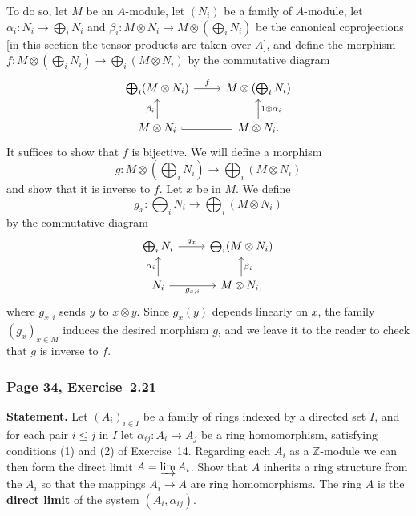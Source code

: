 \documentclass[12pt,letterpaper]{article}%
\begin{document}
To do so, let $M$ be an $A$-module, let $(N_i)$ be a family of $A$-module, let $\alpha_i:N_i\to\bigoplus_iN_i$ and $\beta_i:M\otimes N_i\to M\otimes(\bigoplus_iN_i)$ be the canonical coprojections [in this section the tensor products are taken over $A$], and define the morphism $f:M\otimes(\bigoplus_iN_i)\to\bigoplus_i(M\otimes N_i)$ by the commutative diagram 
$$
\begin{tikzcd} 
\bigoplus_i(M\otimes N_i)\ar[r,"f"]& M\otimes\left(\bigoplus_iN_i\right)\\ 
M\otimes N_i\ar[u,"\beta_i"]\ar[r,equal]&M\otimes N_i.\ar[u,"1\otimes\alpha_i"']
\end{tikzcd}
$$ 
It suffices to show that $f$ is bijective. We will define a morphism 
$$
g:M\otimes(\bigoplus_iN_i)\to\bigoplus_i(M\otimes N_i)
$$ 
and show that it is inverse to $f$. Let $x$ be in $M$. We define 
$$
g_x:\bigoplus_iN_i\to\bigoplus_i(M\otimes N_i)
$$ 
by the commutative diagram 
\[\begin{tikzcd}
	{\bigoplus_iN_i} & {\bigoplus_i(M\otimes N_i)} \\
	{N_i} & {M\otimes N_i,}
	\arrow["{g_x}", from=1-1, to=1-2]
	\arrow["{\alpha_i}", from=2-1, to=1-1]
	\arrow["{\beta_i}"', from=2-2, to=1-2]
	\arrow["{g_{x,i}}"', from=2-1, to=2-2]
\end{tikzcd}\]
where $g_{x,i}$ sends $y$ to $x\otimes y$. Since $g_x(y)$ depends linearly on $x$, the family $(g_x)_{x\in M}$ induces the desired morphism $g$, and we leave it to the reader to check that $g$ is inverse to $f$.

\subsubsection{Page 34, Exercise~2.21}\label{ex2.21}%

\textbf{Statement.} Let $(A_i)_{i\in I}$ be a family of rings indexed by a directed set $I$, and for each pair $i\le j$ in $I$ let $\alpha_{ij}:A_i\to A_j$ be a ring homomorphism, satisfying conditions (1) and (2) of Exercise~14. Regarding each $A_i$ as a $\mathbb Z$-module we can then form the direct limit $A=\varinjlim A_i$. Show that $A$ inherits a ring structure from the $A_i$ so that the mappings $A_i\to A$ are ring homomorphisms. The ring $A$ is the \textbf{direct limit} of the system $(A_i,\alpha_{ij})$.
\end{document}
